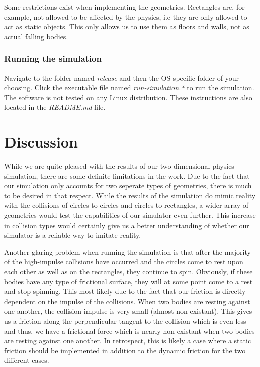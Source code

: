 \documentclass[a4paper,12pt]{report}
\begin{document}
Some restrictions exist when implementing the geometries. Rectangles are, for example, not allowed to be affected by the physics, i.e they are only allowed to act as static objects. This only allows us to use them as floors and walls, not as actual falling bodies.

\subsection{Running the simulation}

Navigate to the folder named \emph{release} and then the OS-specific folder of your choosing. Click the executable file named \emph{run-simulation.*} to run the simulation. The software is not tested on any Linux distribution. These instructions are also located in the \emph{README.md} file.


\chapter{Discussion}

While we are quite pleased with the results of our two dimensional physics simulation, there are some definite limitations in the work. Due to the fact that our simulation only accounts for two seperate types of geometries, there is much to be desired in that respect. While the results of the simulation do mimic reality with the collisions of circles to circles and circles to rectangles, a wider array of geometries would test the capabilities of our simulator even further. This increase in collision types would certainly give us a better understanding of whether our simulator is a reliable way to imitate reality.

Another glaring problem when running the simulation is that after the majority of the high-impulse collisions have occurred and the circles come to rest upon each other as well as on the rectangles, they continue to spin. Obviously, if these bodies have any type of frictional surface, they will at some point come to a rest and stop spinning. This most likely due to the fact that our friction is directly dependent on the impulse of the collisions. When two bodies are resting against one another, the collision impulse is very small (almost non-existant). This gives us a friction along the perpendicular tangent to the collision which is even less and thus, we have a frictional force which is nearly non-existant when two bodies are resting against one another. In retrospect, this is likely a case where a static friction should be implemented in addition to the dynamic friction for the two different cases.






\end{document}
